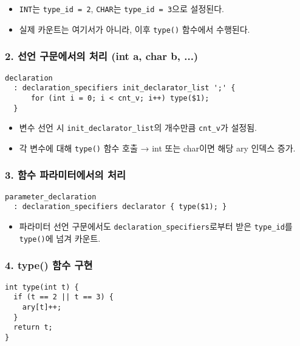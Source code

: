 \documentclass{article}
\begin{document}
\begin{itemize}
  \item \texttt{INT}는 \texttt{type\_id = 2}, \texttt{CHAR}는 \texttt{type\_id = 3}으로 설정된다.
  \item 실제 카운트는 여기서가 아니라, 이후 \texttt{type()} 함수에서 수행된다.
\end{itemize}

\subsubsection*{2. 선언 구문에서의 처리 (int a, char b, ...)}

\begin{lstlisting}
declaration
  : declaration_specifiers init_declarator_list ';' {
      for (int i = 0; i < cnt_v; i++) type($1);
  }
\end{lstlisting}

\begin{itemize}
  \item 변수 선언 시 \texttt{init\_declarator\_list}의 개수만큼 \texttt{cnt\_v}가 설정됨.
  \item 각 변수에 대해 \texttt{type()} 함수 호출 → int 또는 char이면 해당 ary 인덱스 증가.
\end{itemize}

\subsubsection*{3. 함수 파라미터에서의 처리}

\begin{lstlisting}
parameter_declaration
  : declaration_specifiers declarator { type($1); }
\end{lstlisting}

\begin{itemize}
  \item 파라미터 선언 구문에서도 \texttt{declaration\_specifiers}로부터 받은 \texttt{type\_id}를 \texttt{type()}에 넘겨 카운트.
\end{itemize}

\subsubsection*{4. type() 함수 구현}

\begin{lstlisting}
int type(int t) {
  if (t == 2 || t == 3) {
    ary[t]++;
  }
  return t;
}
\end{lstlisting}
\end{document}
